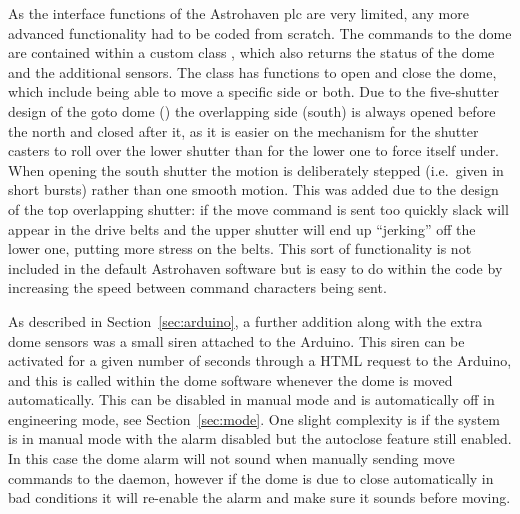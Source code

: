 \begin{colsection}
\begin{colsection}
As the interface functions of the Astrohaven \gls{plc} are very limited, any more advanced functionality had to be coded from scratch. The commands to the dome are contained within a custom  class , which also returns the status of the dome and the additional sensors. The class has functions to open and close the dome, which include being able to move a specific side or both. Due to the five-shutter design of the \gls{goto} dome () the overlapping side (south) is always opened before the north and closed after it, as it is easier on the mechanism for the shutter casters to roll over the lower shutter than for the lower one to force itself under. When opening the south shutter the motion is deliberately stepped (i.e.\ given in short bursts) rather than one smooth motion. This was added due to the design of the top overlapping shutter: if the move command is sent too quickly slack will appear in the drive belts and the upper shutter will end up ``jerking'' off the lower one, putting more stress on the belts. This sort of functionality is not included in the default Astrohaven software but is easy to do within the  code by increasing the speed between command characters being sent.

As described in Section~\ref{sec:arduino}, a further addition along with the extra dome sensors was a small siren attached to the Arduino. This siren can be activated for a given number of seconds through a HTML request to the Arduino, and this is called within the dome software whenever the dome is moved automatically. This can be disabled in manual mode and is automatically off in engineering mode, see Section~\ref{sec:mode}. One slight complexity is if the system is in manual mode with the alarm disabled but the autoclose feature still enabled. In this case the dome alarm will not sound when manually sending move commands to the daemon, however if the dome is due to close automatically in bad conditions it will re-enable the alarm and make sure it sounds before moving.


\end{colsection}
\end{colsection}
